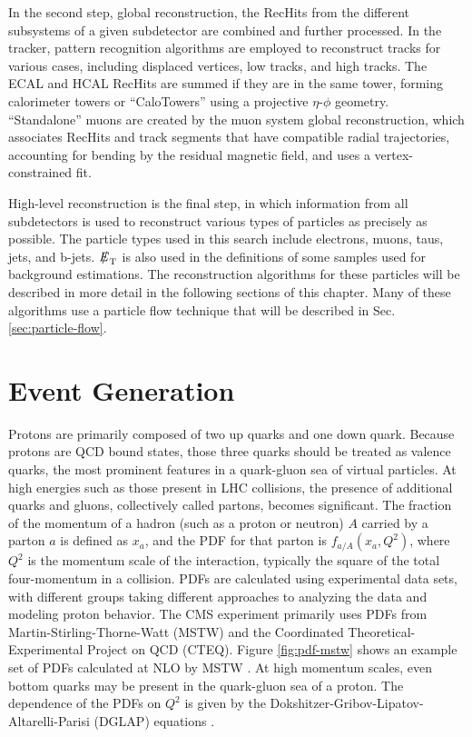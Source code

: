 \documentclass[12pt]{thesis}  %
\def\eslash{\ensuremath{{\hbox{$E$\kern-0.6em\lower-.05ex\hbox{/}\kern0.10em}}}}
\def\met{\mbox{$\eslash_\text{T}$}\xspace} %
\begin{document}
In the second step, global reconstruction, the RecHits from the different subsystems of a given subdetector are combined and further processed. In the tracker, pattern recognition algorithms are employed to reconstruct tracks for various cases, including displaced vertices, low \pt tracks, and high \pt tracks. The ECAL and HCAL RecHits are summed if they are in the same tower, forming calorimeter towers or ``CaloTowers'' using a projective $\eta$-$\phi$ geometry. ``Standalone'' muons are created by the muon system global reconstruction, which associates RecHits and track segments that have compatible radial trajectories, accounting for bending by the residual magnetic field, and uses a vertex-constrained fit.

High-level reconstruction is the final step, in which information from all subdetectors is used to reconstruct various types of particles as precisely as possible. The particle types used in this search include electrons, muons, taus, jets, and b-jets. \met is also used in the definitions of some samples used for background estimations. The reconstruction algorithms for these particles will be described in more detail in the following sections of this chapter. Many of these algorithms use a particle flow technique that will be described in Sec. \ref{sec:particle-flow}.

\section{Event Generation}

Protons are primarily composed of two up quarks and one down quark. Because protons are QCD bound states, those three quarks should be treated as valence quarks, the most prominent features in a quark-gluon sea of virtual particles. At high energies such as those present in LHC collisions, the presence of additional quarks and gluons, collectively called partons, becomes significant. The fraction of the momentum of a hadron (such as a proton or neutron) $A$ carried by a parton $a$ is defined as $x_a$, and the PDF for that parton is $f_{a/A}(x_a,Q^2)$, where $Q^2$ is the momentum scale of the interaction, typically the square of the total four-momentum in a collision. PDFs are calculated using experimental data sets, with different groups taking different approaches to analyzing the data and modeling proton behavior. The CMS experiment primarily uses PDFs from Martin-Stirling-Thorne-Watt (MSTW) and the Coordinated Theoretical-Experimental Project on QCD (CTEQ). Figure \ref{fig:pdf-mstw} shows an example set of PDFs calculated at NLO by MSTW \cite{MSTW09}. At high momentum scales, even bottom quarks may be present in the quark-gluon sea of a proton. The dependence of the PDFs on $Q^2$ is given by the Dokshitzer-Gribov-Lipatov-Altarelli-Parisi (DGLAP) equations \cite{QuarkGluon}.
\end{document}
